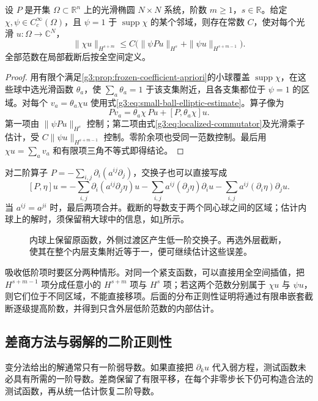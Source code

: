 \begin{lemma}\label{g3:lem:cutoff-elliptic-apriori}
	设 \(P\) 是开集 \(\Omega\subset\mathbb R^n\) 上的光滑椭圆 \(N\times N\) 系统，阶数 \(m\ge1\)，\(s\in\mathbb R\)。给定 \(\chi,\psi\in C_c^\infty(\Omega)\)，且 \(\psi=1\) 于 \(\operatorname{supp}\chi\) 的某个邻域，则存在常数 \(C\)，使对每个光滑 \(u:\Omega\to\mathbb C^N\)，
	\begin{equation}\label{g3:eq:cutoff-elliptic-apriori}
		\|\chi u\|_{H^{s+m}}
		\le C\bigl(\|\psi Pu\|_{H^s}+\|\psi u\|_{H^{s+m-1}}\bigr).
	\end{equation}
	全部范数在局部截断后按全空间定义。
\end{lemma}
\begin{proof}
	用有限个满足\cref{g3:prop:frozen-coefficient-apriori}的小球覆盖 \(\operatorname{supp}\chi\)，在这些球中选光滑函数 \(\theta_a\)，使 \(\sum_a\theta_a=1\) 于该支集附近，且各支集都位于 \(\psi=1\) 的区域。对每个 \(v_a=\theta_a\chi u\) 使用式\eqref{g3:eq:small-ball-elliptic-estimate}。算子像为
	\[
		Pv_a=\theta_a\chi\,Pu+[P,\theta_a\chi]u.
	\]
	第一项由 \(\|\psi Pu\|_{H^s}\) 控制；第二项由式\eqref{g3:eq:localized-commutator}及光滑乘子估计，受 \(C\|\psi u\|_{H^{s+m-1}}\) 控制。零阶余项也受同一范数控制。最后用 \(\chi u=\sum_av_a\) 和有限项三角不等式即得结论。
\end{proof}

对二阶算子 \(P=-\sum_{i,j}\partial_i(a^{ij}\partial_j)\)，交换子也可以直接写成
\[
	[P,\eta]u
	=-\sum_{i,j}\partial_i(a^{ij}\partial_j\eta)u
	-\sum_{i,j}a^{ij}(\partial_j\eta)\partial_i u
	-\sum_{i,j}a^{ij}(\partial_i\eta)\partial_j u.
\]
当 \(a^{ij}=a^{ji}\) 时，最后两项合并。截断的导数支于两个同心球之间的区域；估计内球上的解时，须保留稍大球中的信息，如\cref{g3:fig:elliptic-localization}所示。
\begin{figure}[htbp]
	\centering
	
	\caption[椭圆估计中的嵌套截断]{内球上保留原函数，外侧过渡区产生低一阶交换子。再选外层截断，使其在整个内层支集附近等于一，便可继续估计这些误差。}
	\label{g3:fig:elliptic-localization}
\end{figure}

吸收低阶项时要区分两种情形。对同一个紧支函数，可以直接用全空间插值，把 \(H^{s+m-1}\) 项分成任意小的 \(H^{s+m}\) 项与 \(H^s\) 项；若这两个范数分别属于 \(\chi u\) 与 \(\psi u\)，则它们位于不同区域，不能直接移项。后面的分布正则性证明将通过有限串嵌套截断逐级提高阶数，并得到只含外层低阶范数的内部估计。

\subsection{差商方法与弱解的二阶正则性}
\label{g3:subsec:1203:03}
变分法给出的解通常只有一阶弱导数。如果直接把 \(\partial_k u\) 代入弱方程，测试函数未必具有所需的一阶导数。差商保留了有限平移，在每个非零步长下仍可构造合法的测试函数，再从统一估计恢复二阶导数。

